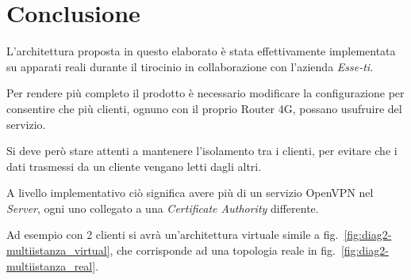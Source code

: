 \chapter{Conclusione \workinprogress}

L'architettura proposta in questo elaborato è stata effettivamente implementata su apparati reali durante il tirocinio in collaborazione con l'azienda \textit{Esse-ti}. 


Per rendere più completo il prodotto è necessario modificare la configurazione per consentire che più clienti, ognuno con il proprio Router 4G, possano usufruire del servizio. 


Si deve però stare attenti a mantenere l'isolamento tra i clienti, per evitare che i dati trasmessi da un cliente vengano letti dagli altri.



A livello implementativo ciò significa avere più di un servizio OpenVPN nel \textit{Server}, ogni uno collegato a una \textit{Certificate Authority} differente.

Ad esempio con 2 clienti si avrà un'architettura virtuale simile a fig.~\ref{fig:diag2-multiistanza_virtual}, che corrisponde ad una topologia reale in fig.~\ref{fig:diag2-multiistanza_real}.

